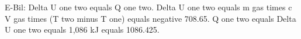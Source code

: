E-Bil: Delta U one two equals Q one two.  
Delta U one two equals m gas times c V gas times (T two minus T one) equals negative 708.65.  
Q one two equals Delta U one two equals 1,086 kJ equals 1086.425.